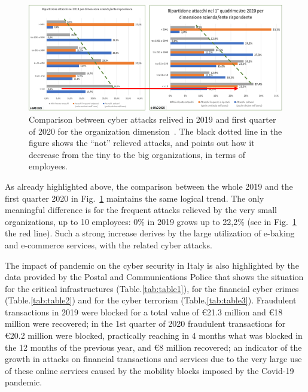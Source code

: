 \documentclass{easychair}
\begin{document}
\begin{figure}
	\centering
		\includegraphics[width=1\textwidth]{pictures/fig3.png}
		\caption{Comparison between cyber attacks relived in 2019 and first quarter of 2020 for the organization dimension~\cite{oad20}. The black dotted line in the figure shows 
the “not” relieved attacks, and points out how it decrease from the tiny to the big organizations, in terms of employees. }
		\label{fig:3}
\end{figure}


As already highlighted above, the comparison between the whole 2019 and the first quarter 2020 in Fig.~\ref{fig:3} maintains the same logical trend. The only meaningful difference is for the frequent attacks relieved by the very
small organizations, up to 10 employees: 0\% in 2019 grows up to 22,2\% (see in Fig.~\ref{fig:3} the red line). Such a strong increase derives by the large utilization of e-baking and 
e-commerce services, with the related cyber attacks.

The impact of pandemic on the cyber security in Italy is also highlighted by the data provided by the Postal and Communications Police that shows the situation for the
critical infrastructures (Table.\ref{tab:table1}), for the financial cyber crimes (Table.\ref{tab:table2}) and for the cyber terrorism (Table.\ref{tab:table3}). 
Fraudulent transactions in 2019 were blocked for a total value of \euro 21.3 million and \euro 18 million were recovered; in the 1st quarter of 
2020 fraudulent transactions for \euro 20.2 million were blocked, practically reaching in 4 months what was blocked in the 12 months of the previous year, and \euro 8 million 
recovered; an indicator of the growth in attacks on financial transactions and services due to the very large use of these online services caused by the mobility blocks imposed 
by the Covid-19 pandemic.
\end{document}
